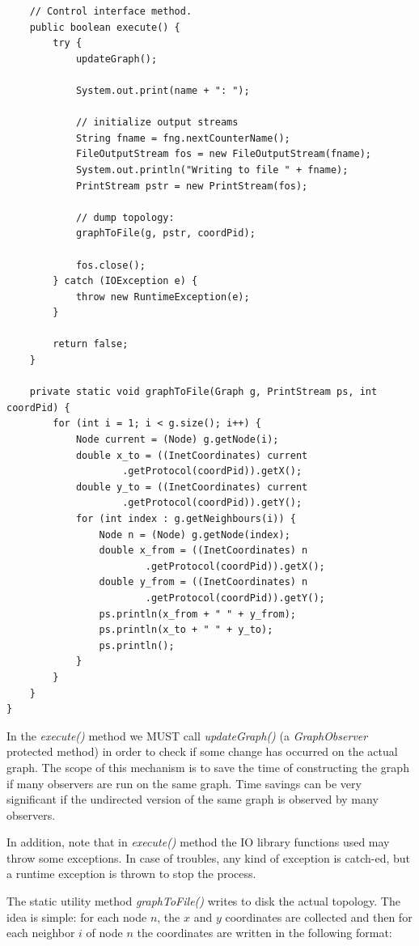 \documentclass[a4paper,11pt]{article}
\begin{document}
\begin{verbatim}
    // Control interface method.
    public boolean execute() {
        try {
            updateGraph();

            System.out.print(name + ": ");

            // initialize output streams
            String fname = fng.nextCounterName();
            FileOutputStream fos = new FileOutputStream(fname);
            System.out.println("Writing to file " + fname);
            PrintStream pstr = new PrintStream(fos);

            // dump topology:
            graphToFile(g, pstr, coordPid);

            fos.close();
        } catch (IOException e) {
            throw new RuntimeException(e);
        }

        return false;
    }

    private static void graphToFile(Graph g, PrintStream ps, int coordPid) {
        for (int i = 1; i < g.size(); i++) {
            Node current = (Node) g.getNode(i);
            double x_to = ((InetCoordinates) current
                    .getProtocol(coordPid)).getX();
            double y_to = ((InetCoordinates) current
                    .getProtocol(coordPid)).getY();
            for (int index : g.getNeighbours(i)) {
                Node n = (Node) g.getNode(index);
                double x_from = ((InetCoordinates) n
                        .getProtocol(coordPid)).getX();
                double y_from = ((InetCoordinates) n
                        .getProtocol(coordPid)).getY();
                ps.println(x_from + " " + y_from);
                ps.println(x_to + " " + y_to);
                ps.println();
            }
        }
    }
}
\end{verbatim}
\normalsize

In the \emph{execute()} method we MUST call \emph{updateGraph()} (a
\emph{GraphObserver} protected method) in order to check if some
change has occurred on the actual graph. 
The scope of this mechanism is to save the time of constructing the
graph if many observers are run on the same graph. Time savings can be very
significant if the undirected version of the same graph is observed by
many observers.

In addition, note that in \emph{execute()} method the IO library functions
used may throw some exceptions. In case of troubles, any kind of
exception is catch-ed, but a runtime exception is thrown to stop the
process. 

The static utility method \emph{graphToFile()} writes to disk the
actual topology. The idea is simple: for each node
$n$, the $x$ and $y$ coordinates are collected and then for each
neighbor $i$ of node $n$ the coordinates are written in the following
format: 
\end{document}
